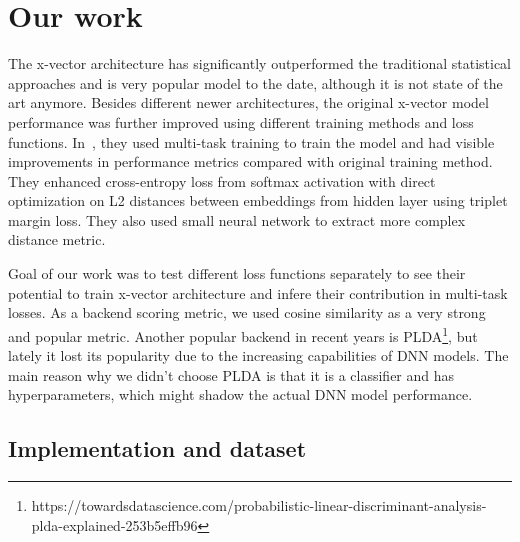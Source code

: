 \section{Our work}
The x-vector architecture has significantly outperformed the traditional statistical approaches and is very popular model to the date, although it is not state of the art anymore. Besides different newer architectures, the original x-vector model performance was further improved using different training methods and loss functions. In~\cite{x_vectors_triplet}, they used multi-task training to train the model and had visible improvements in performance metrics compared with original training method. They enhanced cross-entropy loss from softmax activation with direct optimization on L2 distances between embeddings from hidden layer using triplet margin loss. They also used small neural network to extract more complex distance metric.

\medskip
Goal of our work was to test different loss functions separately to see their potential to train x-vector architecture and infere their contribution in multi-task losses. As a backend scoring metric, we used cosine similarity as a very strong and popular metric. Another popular backend in recent years is PLDA\footnote{https://towardsdatascience.com/probabilistic-linear-discriminant-analysis-plda-explained-253b5effb96}, but lately it lost its popularity due to the increasing capabilities of DNN models. The main reason why we didn't choose PLDA is that it is a classifier and has hyperparameters, which might shadow the actual DNN model performance.

\subsection*{Implementation and dataset}

